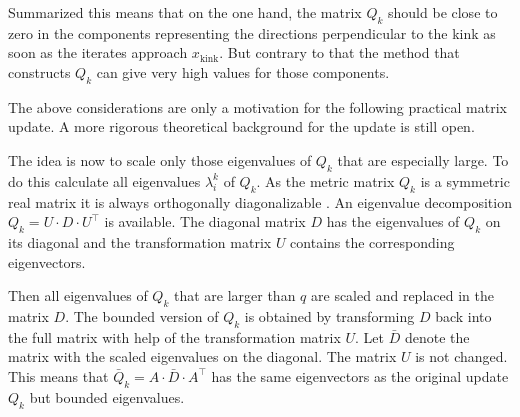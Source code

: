 Summarized this means that on the one hand, the matrix \(Q_k\) should be close to zero in the components representing the directions perpendicular to the kink as soon as the iterates approach \(x_{\text{kink}}\). But contrary to that the method that constructs \(Q_k\) can give very high values for those components.

\begin{remark}
	The above considerations are only a motivation for the following practical matrix update. A more rigorous theoretical background for the update is still open.
\end{remark}

The idea is now to scale only those eigenvalues of \(Q_k\) that are especially large.
To do this calculate all eigenvalues \(\lambda^k_i\) of \(Q_k\).
As the metric matrix \(Q_k\) is a symmetric real matrix it is  always orthogonally diagonalizable \cite[Corollary 18.18 p. 282]{Liesen2015}. An eigenvalue decomposition \(Q_k = U\cdot D \cdot U^{\top}\) is available. The diagonal matrix \(D\) has the eigenvalues of \(Q_k\) on its diagonal and the transformation matrix \(U\) contains the corresponding eigenvectors.



Then all eigenvalues of \(Q_k\) that are larger than \(q\) are scaled and replaced in the matrix \(D\). The bounded version of \(Q_k\) is obtained by transforming \(D\) back into the full matrix with help of the transformation matrix \(U\).
Let \(\bar{D}\) denote the matrix with the scaled eigenvalues on the diagonal. The matrix \(U\) is not changed. This means that \(\bar{Q}_k = A\cdot\bar{D}\cdot A^{\top}\) has the same eigenvectors as the original update \(Q_k\) but bounded eigenvalues.



